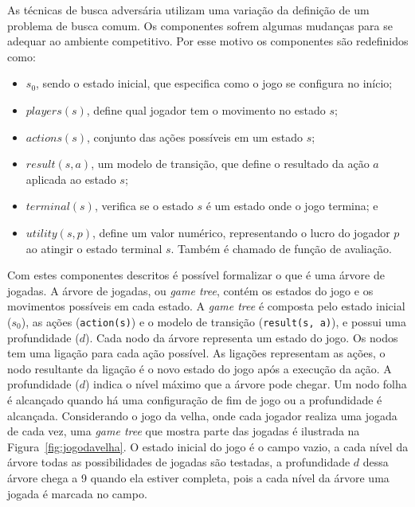 As técnicas de busca adversária utilizam uma variação da definição de um problema de busca comum. 
Os componentes sofrem algumas mudanças para se adequar ao ambiente competitivo.
Por esse motivo os componentes são redefinidos como:

\begin{itemize}
	\item $s_{0}$, sendo o estado inicial, que especifica como o jogo se configura no início;
	\item $players(s)$, define qual jogador tem o movimento no estado $s$;
	\item $actions(s)$, conjunto das ações possíveis em um estado $s$;
	\item $result(s, a)$, um modelo de transição, que define o resultado da ação $a$ aplicada ao estado $s$;
	\item $terminal(s)$, verifica se o estado $s$ é um estado onde o jogo termina; e
	\item $utility(s,p)$, define um valor numérico, representando o lucro do jogador $p$ ao atingir o estado terminal $s$. Também é chamado de função de avaliação.
\end{itemize}

Com estes componentes descritos é possível formalizar o que é uma árvore de jogadas. 
A árvore de jogadas, ou \textit{game tree}, contém os estados do jogo e os movimentos possíveis em cada estado. 
A \textit{game tree} é composta pelo estado inicial ($s_{0}$), as ações (\texttt{action(s)}) e o modelo de transição (\texttt{result(s, a)}), e possui uma profundidade ($d$). 
Cada nodo da árvore representa um estado do jogo. 
Os nodos tem uma ligação para cada ação possível. As ligações representam as ações, o nodo resultante da ligação é o novo estado do jogo após a execução da ação.
A profundidade ($d$) indica o nível máximo que a árvore pode chegar.
Um nodo folha é alcançado quando há uma configuração de fim de jogo ou a profundidade é alcançada.
Considerando o jogo da velha, onde cada jogador realiza uma jogada de cada vez, uma \textit{game tree} que mostra parte das jogadas é ilustrada na Figura~\ref{fig:jogodavelha}. 
O estado inicial do jogo é o campo vazio, a cada nível da árvore todas as possibilidades de jogadas são testadas, a profundidade $d$ dessa árvore chega a 9 quando ela estiver completa, pois a cada nível da árvore uma jogada é marcada no campo. 

